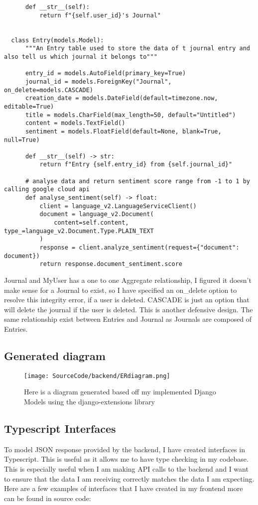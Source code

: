 \begin{verbatim}
      def __str__(self):
          return f"{self.user_id}'s Journal"
  
  
  class Entry(models.Model):
      """An Entry table used to store the data of t journal entry and also tell us which journal it belongs to"""
  
      entry_id = models.AutoField(primary_key=True)
      journal_id = models.ForeignKey("Journal", on_delete=models.CASCADE)
      creation_date = models.DateField(default=timezone.now, editable=True)
      title = models.CharField(max_length=50, default="Untitled")
      content = models.TextField()
      sentiment = models.FloatField(default=None, blank=True, null=True)
  
      def __str__(self) -> str:
          return f"Entry {self.entry_id} from {self.journal_id}"
  
      # analyse data and return sentiment score range from -1 to 1 by calling google cloud api
      def analyse_sentiment(self) -> float:
          client = language_v2.LanguageServiceClient()
          document = language_v2.Document(
              content=self.content, type_=language_v2.Document.Type.PLAIN_TEXT
          )
          response = client.analyze_sentiment(request={"document": document})
          return response.document_sentiment.score
\end{verbatim}

Journal and MyUser has a one to one Aggregate relationship, I figured it doesn't make sense for a Journal to exist, so I have specified an on\_delete option to resolve this integrity error, if a user is deleted. CASCADE is just an option that will delete the journal if the user is deleted. This is another defensive design. The same relationship exist between Entries and Journal as Journals are composed of Entries.


\subsection{Generated diagram}

\begin{figure}[H]
  \centering
  \texttt{[image: SourceCode/backend/ERdiagram.png]}
  \caption{Here is a diagram generated based off my implemented Django Models using the django-extensions library}
  \label{fig:ERdiagram}
\end{figure}

\subsection{Typescript Interfaces}
To model JSON response provided by the backend, I have created interfaces in Typescript. This is useful as it allows me to have type checking in my codebase. This is especially useful when I am making API calls to the backend and I want to ensure that the data I am receiving correctly matches the data I am expecting. Here are a few examples of interfaces that I have created in my frontend more can be found in source code:


